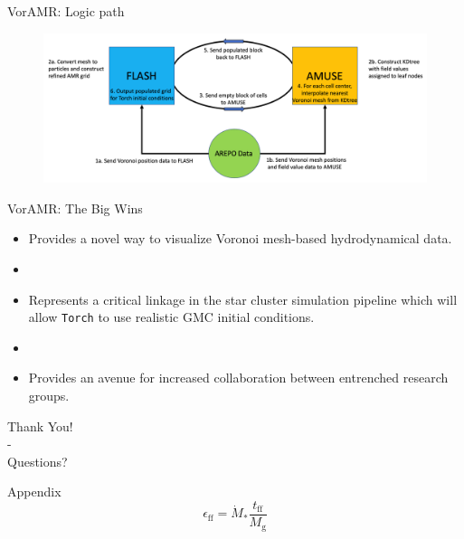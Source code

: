 \documentclass[aspectratio=169]{beamer}
\begin{document}
%
%
%
%
%
\begin{frame}{VorAMR: Logic path}
	\begin{figure}[h!]
                \centering
                \includegraphics[width=\linewidth]{../images/voramr_logic.png} \\
                \label{fig:voramr_logic}
	\end{figure}
\end{frame}
%
%
%
%
%
\begin{frame}{VorAMR: The Big Wins}{}
    \begin{itemize}
    	\item Provides a novel way to visualize Voronoi mesh-based hydrodynamical data.
	\item []
    	\item Represents a critical linkage in the star cluster simulation pipeline which will allow \texttt{Torch} to use realistic GMC initial conditions.
	\item []
	\item Provides an avenue for increased collaboration between entrenched research groups.
    \end{itemize}
\end{frame}
%
%
%
%
%
\begin{frame}{}
	\centering Thank You! \\ - \\ Questions?
\end{frame}

\begin{frame}{Appendix}
	\begin{equation}\label{eqn:sfe}
		\epsilon_{\text{ff}} = \dot{M}_{*}\frac{t_{\text{ff}}}{M_{\text{g}}}
	\end{equation}
\end{frame}
\end{document}
